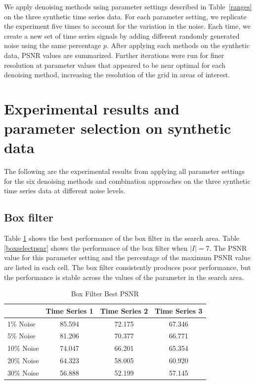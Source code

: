 \documentclass[11pt]{article}
\theoremstyle{definition}
\begin{document}
We apply denoising methods using parameter settings described in
Table~\ref{ranges} on the three synthetic time series data. For each
parameter setting, we replicate the experiment five times to account
for the variation in the noise. Each time, we create a new set of time
series signals by adding different randomly generated noise using the
same percentage $p$. After applying each methods on the synthetic
data, PSNR values are summarized. Further iterations were run for
finer resolution at parameter values that appeared to be near optimal
for each denoising method, increasing the resolution of the grid in
areas of interest.


\section{Experimental results and parameter selection on synthetic data}
\label{results}

The following are the experimental results from applying all parameter
settings for the six denoising methods and combination approaches on
the three synthetic time series data at different noise levels.

\subsection{Box filter} 
Table \ref{boxbestpsnr} shows the best performance of the box filter
in the search area. Table \ref{boxselectpsnr} shows the performance of
the box filter when $\lvert I \rvert = 7$. The PSNR value for this
parameter setting and the percentage of the maximum PSNR value are
listed in each cell. The box filter consistently produces poor
performance, but the performance is stable across the values of the
parameter in the search area.

\begin{table}[!h]
\small
\begin{center}
\begin{tabular}{lccc}
\hline
 & Time Series 1 & Time Series 2 & Time Series 3 \\ \hline
1\% Noise & 85.594 & 72.175 & 67.346 \\ \hline
5\% Noise & 81.206 & 70.377 & 66.771 \\ \hline
10\% Noise & 74.047 & 66.201 & 65.354 \\ \hline
20\% Noise & 64.323 & 58.005 & 60.920 \\ \hline
30\% Noise & 56.888 & 52.199 & 57.145 \\ \hline
\end{tabular}
\caption{Box Filter Best PSNR}
\label{boxbestpsnr}
\end{center}
\end{table}
\end{document}
